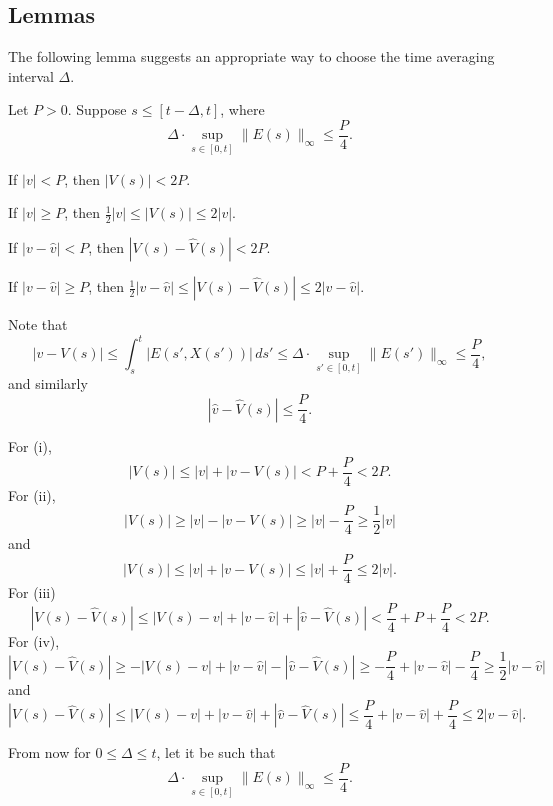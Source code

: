 \documentclass[11pt]{amsart}
\begin{document}
\subsection{Lemmas}
The following lemma suggests an appropriate way to choose the time averaging interval $\Delta$.
\begin{lem}
Let $P>0$.
Suppose $s\le[t-\Delta,t]$, where
\[\Delta\cdot\sup_{s\in[0,t]}\|E(s)\|_\infty\le\frac P4.\]
\begin{cond}
\item If $|v|<P$, then $|V(s)|<2P$.
\item If $|v|\ge P$, then $\frac12|v|\le|V(s)|\le2|v|$. 
\item If $|v-\hat v|<P$, then $|V(s)-\hat V(s)|<2P$.
\item If $|v-\hat v|\ge P$, then $\frac12|v-\hat v|\le|V(s)-\hat V(s)|\le2|v-\hat v|$.
\end{cond}
\end{lem}
\begin{pf}
Note that
\[|v-V(s)|\le\int_s^t|E(s',X(s'))|\,ds'\le\Delta\cdot\sup_{s'\in[0,t]}\|E(s')\|_\infty\le\frac P4,\]
and similarly
\[|\hat v-\hat V(s)|\le\frac P4.\]

For (i),
\[|V(s)|\le|v|+|v-V(s)|<P+\frac P4<2P.\]
For (ii),
\[|V(s)|\ge|v|-|v-V(s)|\ge|v|-\frac P4\ge\frac12|v|\]
and
\[|V(s)|\le|v|+|v-V(s)|\le|v|+\frac P4\le2|v|.\]
For (iii)
\[|V(s)-\hat V(s)|\le|V(s)-v|+|v-\hat v|+|\hat v-\hat V(s)|<\frac P4+P+\frac P4<2P.\]
For (iv),
\[|V(s)-\hat V(s)|\ge-|V(s)-v|+|v-\hat v|-|\hat v-\hat V(s)|\ge-\frac P4+|v-\hat v|-\frac P4\ge\frac12|v-\hat v|\]
and
\[|V(s)-\hat V(s)|\le|V(s)-v|+|v-\hat v|+|\hat v-\hat V(s)|\le\frac P4+|v-\hat v|+\frac P4\le2|v-\hat v|.\]
\end{pf}


From now for $0\le\Delta\le t$, let it be such that
\[\Delta\cdot\sup_{s\in[0,t]}\|E(s)\|_\infty\le\frac P4.\]
\end{document}
